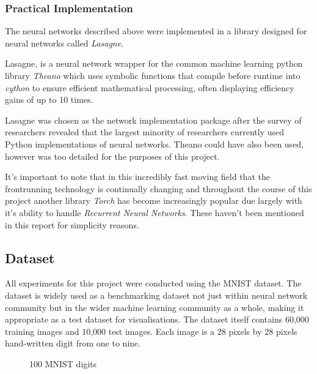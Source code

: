 \documentclass[a4paper,11pt,titlepage]{article}
\begin{document}
		\subsubsection{Practical Implementation}
		The neural networks described above were implemented in a library designed for neural networks called \textit{Lasagne}.
		\par 
		Lasagne, is a neural network wrapper for the common machine learning python library \textit{Theano} which uses symbolic functions that compile before runtime into \textit{cython} to ensure efficient mathematical processing, often displaying efficiency gains of up to 10 times.
		\par 
		Lasagne was chosen as the network implementation package after the survey of researchers revealed that the largest minority of researchers currently used Python implementations of neural networks. Theano could have also been used, however was too detailed for the purposes of this project. 
		\par 
		It's important to note that in this incredibly fast moving field that the frontrunning technology is continually changing and throughout the course of this project another library \textit{Torch} has become increasingly popular due largely with it's ability to handle \textit{Recurrent Neural Networks}. These haven't been mentioned in this report for simplicity reasons. 
	
	\subsection{Dataset}

	All experiments for this project were conducted using the MNIST dataset. The dataset is widely used as a  benchmarking dataset not just within neural network community but in the wider machine learning community as a whole, making it appropriate as a test dataset for visualisations. The dataset itself contains 60,000 training images and 10,000 test images. Each image is a 28 pixels by 28 pixels hand-written digit from one to nine.
	
	\begin{figure}[H]
    			\caption{100 MNIST digits}%
	\end{figure}
	
\end{document}
